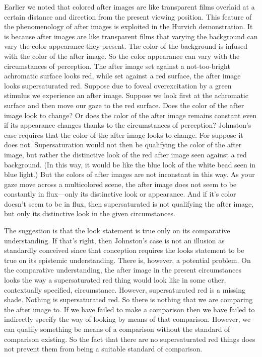\documentclass[12pt]{article}
\begin{document}
Earlier we noted that colored after images are like transparent films overlaid at a certain distance and direction from the present viewing position. This feature of the phenomenology of after images is exploited in the Hurvich demonstration. It is because after images are like transparent films that varying the background can vary the color appearance they present. The color of the background is infused with the color of the after image. So the color appearance can vary with the circumstances of perception. The after image set against a not-too-bright achromatic surface looks red, while set against a red surface, the after image looks supersaturated red. Suppose due to foveal overexcitation by a green stimulus we experience an after image. Suppose we look first at the achromatic surface and then move our gaze to the red surface. Does the color of the after image look to change? Or does the color of the after image remains constant even if its appearance changes thanks to the circumstances of perception? Johnston's case requires that the color of the after image looks to change. For suppose it does not. Supersaturation would not then be qualifying the color of the after image, but rather the distinctive look of the red after image seen against a red background. (In this way, it would be like the blue look of the white bead seen in blue light.) But the colors of after images are not inconstant in this way. As your gaze move across a multicolored scene, the after image does not seem to be constantly in flux---only its distinctive look or appearance. And if it's color doesn't seem to be in flux, then supersaturated is not qualifying the after image, but only its distinctive look in the given circumstances.

The suggestion is that the look statement is true only on its comparative understanding. If that's right, then Johnston's case is not an illusion as standardly conceived since that conception requires the looks statement to be true on its epistemic understanding. There is, however, a potential problem. On the comparative understanding, the after image in the present circumstances looks the way a supersaturated red thing would look like in some other, contextually specified, circumstance. However, supersaturated red is a missing shade. Nothing is supersaturated red. So there is nothing that we are comparing the after image to. If we have failed to make a comparison then we have failed to indirectly specify the way of looking by means of that comparison. However, we can qualify something be means of a comparison without the standard of comparison existing. So the fact that there are no supersaturated red things does not prevent them from being a suitable standard of comparison.
\end{document}
